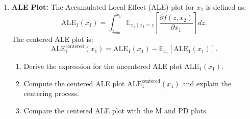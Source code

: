 {\begin{enumerate}
\item \textbf{ALE Plot:}
The Accumulated Local Effect (ALE) plot for \(x_1\) is defined as:
\[
\text{ALE}_1(x_1) = \int_{z_{\min}}^{x_1} \mathbb{E}_{x_2 \mid x_1 = z} \left[ \frac{\partial \hat{f}(z, x_2)}{\partial x_1} \right] dz.
\]
The centered ALE plot is:
\[
\text{ALE}_1^{\text{centered}}(x_1) = \text{ALE}_1(x_1) - \mathbb{E}_{x_1} \left[ \text{ALE}_1(x_1) \right].
\]
\begin{enumerate}
    \item Derive the expression for the uncentered ALE plot \(\text{ALE}_1(x_1)\).
    \item Compute the centered ALE plot \(\text{ALE}_1^{\text{centered}}(x_1)\) and explain the centering process.
    \item Compare the centered ALE plot with the M and PD plots. %
\end{enumerate}

\end{enumerate}
}
